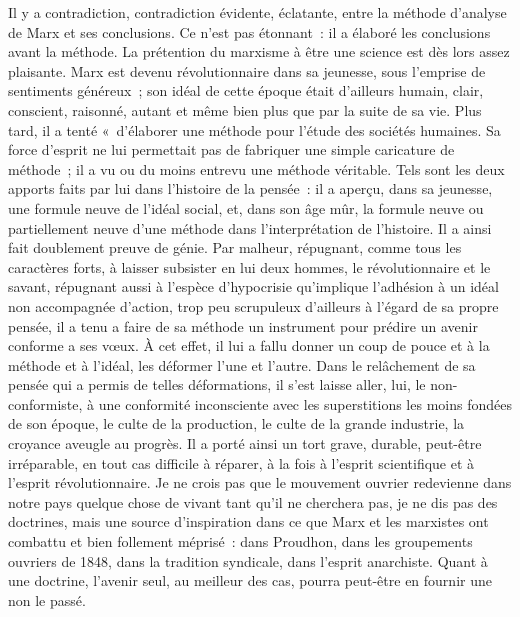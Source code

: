 \documentclass[french,twoside]{book} %
\begin{document}
Il y a contradiction, contradiction évidente, éclatante, entre la méthode d'analyse de Marx et ses conclusions. Ce n'est pas étonnant : il a élaboré les conclusions avant la méthode. La prétention du marxisme à être une science est dès lors assez plaisante. Marx est devenu révolutionnaire dans sa jeunesse, sous l'emprise de sentiments généreux ; son idéal de cette époque était d'ailleurs humain, clair, conscient, raisonné, autant et même bien plus que par la suite de sa vie. Plus tard, il a tenté « d'élaborer une méthode pour l'étude des sociétés humaines. Sa force d'esprit ne lui permettait pas de fabriquer une simple caricature de méthode ; il a vu ou du moins entrevu une méthode véritable. Tels sont les deux apports faits par lui dans l'histoire de la pensée : il a aperçu, dans sa jeunesse, une formule neuve de l'idéal social, et, dans son âge mûr, la formule neuve ou partiellement neuve d'une méthode dans l'interprétation de l'histoire. Il a ainsi fait doublement preuve de génie. Par malheur, répugnant, comme tous les caractères forts, à laisser subsister en lui deux hommes, le révolutionnaire et le savant, répugnant aussi à l'espèce d'hypocrisie qu'implique l'adhésion à un idéal non accompagnée d'action, trop peu scrupuleux d'ailleurs à l'égard de sa propre pensée, il a tenu a faire de sa méthode un instrument pour prédire un avenir conforme a ses vœux. À cet effet, il lui a fallu donner un coup de pouce et à la méthode et à l'idéal, les déformer l'une et l'autre. Dans le relâchement de sa pensée qui a permis de telles déformations, il s'est laisse aller, lui, le non-conformiste, à une conformité inconsciente avec les superstitions les moins fondées de son époque, le culte de la production, le culte de la grande industrie, la croyance aveugle au progrès. Il a porté ainsi un tort grave, durable, peut-être irréparable, en tout cas difficile à réparer, à la fois à l'esprit scientifique et à l'esprit révolutionnaire. Je ne crois pas que le mouvement ouvrier redevienne dans notre pays quelque chose de vivant tant qu’il ne cherchera pas, je ne dis pas des doctrines, mais une source d'inspiration dans ce que Marx et les marxistes ont combattu et bien follement méprisé : dans Proudhon, dans les groupements ouvriers de 1848, dans la tradition syndicale, dans l'esprit anarchiste. Quant à une doctrine, l'avenir seul, au meilleur des cas, pourra peut-être en fournir une non le passé.\par
\end{document}

